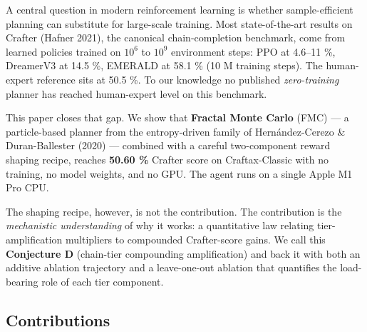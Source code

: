 \documentclass[11pt,letterpaper]{article}
\begin{document}
A central question in modern reinforcement learning is whether
sample-efficient planning can substitute for large-scale training. Most
state-of-the-art results on Crafter (Hafner 2021), the canonical
chain-completion benchmark, come from learned policies trained on $10^6$
to $10^9$ environment steps: PPO at 4.6–11 \%, DreamerV3 at 14.5 \%,
EMERALD at 58.1 \% (10 M training steps). The human-expert reference
sits at 50.5 \%. To our knowledge no published \emph{zero-training} planner
has reached human-expert level on this benchmark.

This paper closes that gap. We show that \textbf{Fractal Monte Carlo} (FMC)
— a particle-based planner from the entropy-driven family of
Hernández-Cerezo \& Duran-Ballester (2020) — combined with a careful
two-component reward shaping recipe, reaches \textbf{50.60 \%} Crafter score
on Craftax-Classic with no training, no model weights, and no GPU. The
agent runs on a single Apple M1 Pro CPU.

The shaping recipe, however, is not the contribution. The contribution
is the \emph{mechanistic understanding} of why it works: a quantitative law
relating tier-amplification multipliers to compounded Crafter-score
gains. We call this \textbf{Conjecture D} (chain-tier compounding
amplification) and back it with both an additive ablation trajectory and
a leave-one-out ablation that quantifies the load-bearing role of each
tier component.

\subsection{Contributions}
\end{document}
